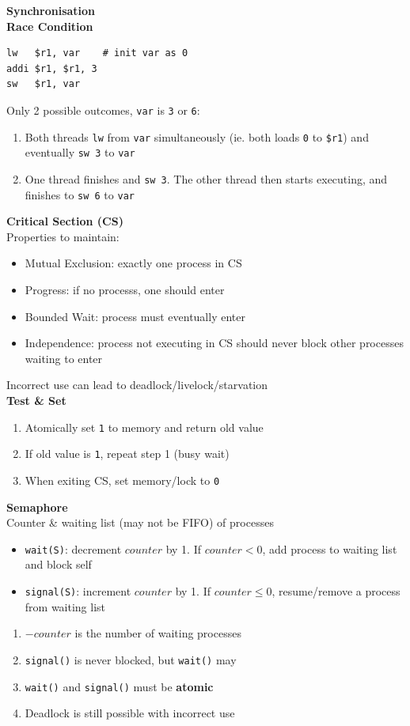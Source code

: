 \documentclass[a4paper, 12pt]{article}
\begin{document}
\begin{multicols*}{4}
{\small\textbf{Synchronisation}} \\
\textbf{Race Condition}
\begin{lstlisting}
lw   $r1, var    # init var as 0
addi $r1, $r1, 3 
sw   $r1, var
\end{lstlisting}
Only 2 possible outcomes, \texttt{var} is \texttt{3} or \texttt{6}:
\begin{enumerate}
	\item Both threads \texttt{lw} from \texttt{var} simultaneously (ie. both loads \texttt{0} to \texttt{\$r1}) and eventually \texttt{sw 3} to \texttt{var}
	\item One thread finishes and \texttt{sw 3}. The other thread then starts executing, and finishes to \texttt{sw 6} to \texttt{var}
\end{enumerate}
\textbf{Critical Section (CS)} \\
Properties to maintain:
\begin{itemize}
	\item Mutual Exclusion: exactly one process in CS
	\item Progress: if no processs, one should enter
	\item Bounded Wait: process must eventually enter
	\item Independence: process not executing in CS should never block other processes waiting to enter
\end{itemize}
Incorrect use can lead to deadlock/livelock/starvation \\
\textbf{Test \& Set}
\begin{enumerate}
	\item Atomically set \texttt{1} to memory and return old value
	\item If old value is \texttt{1}, repeat step 1 (busy wait)
	\item When exiting CS, set memory/lock to \texttt{0}
\end{enumerate}
\textbf{Semaphore} \\
Counter \& waiting list (may not be FIFO) of processes
\begin{itemize}
	\item \texttt{wait(S)}: decrement $counter$ by 1. If $counter < 0$, add process to waiting list and block self
	\item \texttt{signal(S)}: increment $counter$ by 1. If $counter \leq 0$, resume/remove a process from waiting list
\end{itemize}
\begin{enumerate}
	\item $-counter$ is the number of waiting processes
	\item \texttt{signal()} is never blocked, but \texttt{wait()} may
	\item \texttt{wait()} and \texttt{signal()} must be \textbf{atomic}
	\item Deadlock is still possible with incorrect use
\end{enumerate}


\end{multicols*}
\end{document}
